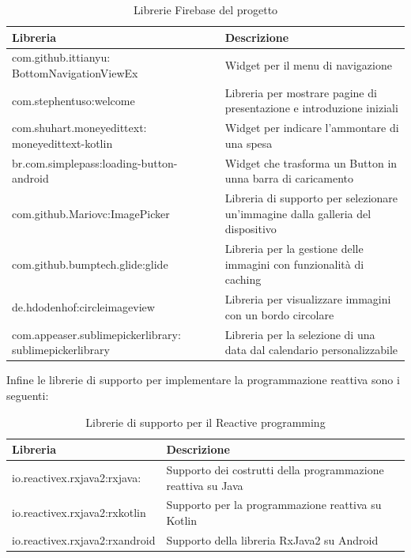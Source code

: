 \begin{table}[!h]
\begin{center}
\begin{tabular}{|p{6cm}|p{7cm}|}
    \hline
\textbf{Libreria} & \textbf{Descrizione}\\ \hline
com.github.ittianyu: BottomNavigationViewEx  & Widget per il menu di navigazione  \\ \hline
com.stephentuso:welcome  & Libreria per mostrare pagine di presentazione e introduzione iniziali \\ \hline
com.shuhart.moneyedittext: moneyedittext-kotlin  & Widget per indicare l'ammontare di una spesa \\ \hline
br.com.simplepass:loading-button-android  & Widget che trasforma un Button in unna barra di caricamento  \\ \hline
com.github.Mariovc:ImagePicker  & Libreria di supporto per selezionare un'immagine dalla galleria del dispositivo  \\ \hline
com.github.bumptech.glide:glide & Libreria per la gestione delle immagini con funzionalità di caching \\ \hline
de.hdodenhof:circleimageview  & Libreria per visualizzare immagini con un bordo circolare \\ \hline
com.appeaser.sublimepickerlibrary: sublimepickerlibrary & Libreria per la selezione di una data dal calendario personalizzabile  \\ \hline
\end{tabular}
\caption[Librerie Firebase del progetto]{Librerie Firebase del progetto}\label{tab:Librerie Firebase del progetto}
\end{center}
\end{table}

\newpage
Infine le librerie di supporto per implementare la programmazione reattiva sono i seguenti:


\begin{table}[!h]
\begin{center}
\begin{tabular}{|l|p{8cm}|}
    \hline
\textbf{Libreria} & \textbf{Descrizione}\\ \hline
io.reactivex.rxjava2:rxjava:& Supporto dei costrutti della programmazione reattiva su Java  \\ \hline
io.reactivex.rxjava2:rxkotlin & Supporto per la programmazione reattiva su Kotlin  \\ \hline
io.reactivex.rxjava2:rxandroid & Supporto della libreria RxJava2 su Android  \\ \hline
\end{tabular}
\caption[Librerie di supporto per il Reactive programming]{Librerie di supporto per il Reactive programming}\label{tab:Librerie di supporto per il Reactive programming}
\end{center}
\end{table}
